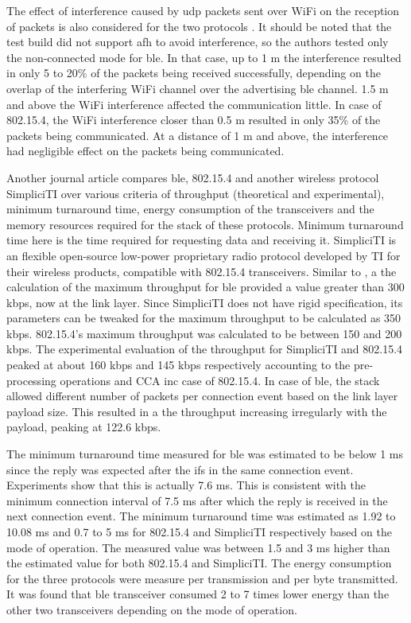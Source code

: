The effect of interference caused by \gls{udp} packets sent over WiFi on the reception of packets is also considered for the two protocols  \cite{Siekkinen2012}. It should be noted that the test build did not support \gls{afh} to avoid interference, so the authors tested only the non-connected mode for \gls{ble}. In that case, up to 1 m the interference resulted in only 5 to 20\% of the packets being received successfully, depending on the overlap of the interfering WiFi channel over the advertising \gls{ble} channel. 1.5 m and above the WiFi interference affected the communication little. In case of 802.15.4, the WiFi interference closer than 0.5 m resulted in only 35\% of the packets being communicated. At a distance of 1 m and above, the interference had negligible effect on the packets being communicated.

Another journal article  \cite{Mikhaylov2013} compares \gls{ble}, 802.15.4 and another wireless protocol SimpliciTI over various criteria of throughput (theoretical and experimental), minimum turnaround time, energy consumption of the transceivers and the memory resources required for the stack of these protocols. Minimum turnaround time here is the time required for requesting data and receiving it. SimpliciTI is an flexible open-source low-power proprietary radio protocol developed by TI for their wireless products, compatible with 802.15.4 transceivers. Similar to  \cite{Gomez2011}, a the calculation of the maximum throughput for \gls{ble} provided a value greater than 300 kbps, now at the link layer. Since SimpliciTI does not have rigid specification, its parameters can be tweaked for the maximum throughput to be calculated as 350 kbps. 802.15.4's maximum throughput was calculated to be between 150 and 200 kbps. The experimental evaluation of the throughput for SimpliciTI and 802.15.4 peaked at about 160 kbps and 145 kbps respectively accounting to the pre-processing operations and CCA inc case of 802.15.4. In case of \gls{ble}, the stack allowed different number of packets per connection event based on the link layer payload size. This resulted in a the throughput increasing irregularly with the payload, peaking at 122.6 kbps.

The minimum turnaround time measured for \gls{ble} was estimated to be below 1 ms since the reply was expected after the \gls{ifs} in the same connection event. Experiments show that this is actually 7.6 ms. This is consistent with the minimum connection interval of 7.5 ms after which the reply is received in the next connection event. The minimum turnaround time was estimated as 1.92 to 10.08 ms and 0.7 to 5 ms for 802.15.4 and SimpliciTI respectively based on the mode of operation. The measured value was between 1.5 and 3 ms higher than the estimated value for both 802.15.4 and SimpliciTI. The energy consumption for the three protocols were measure per transmission and per byte transmitted. It was found that \gls{ble} transceiver consumed 2 to 7 times lower energy than the other two transceivers depending on the mode of operation.

